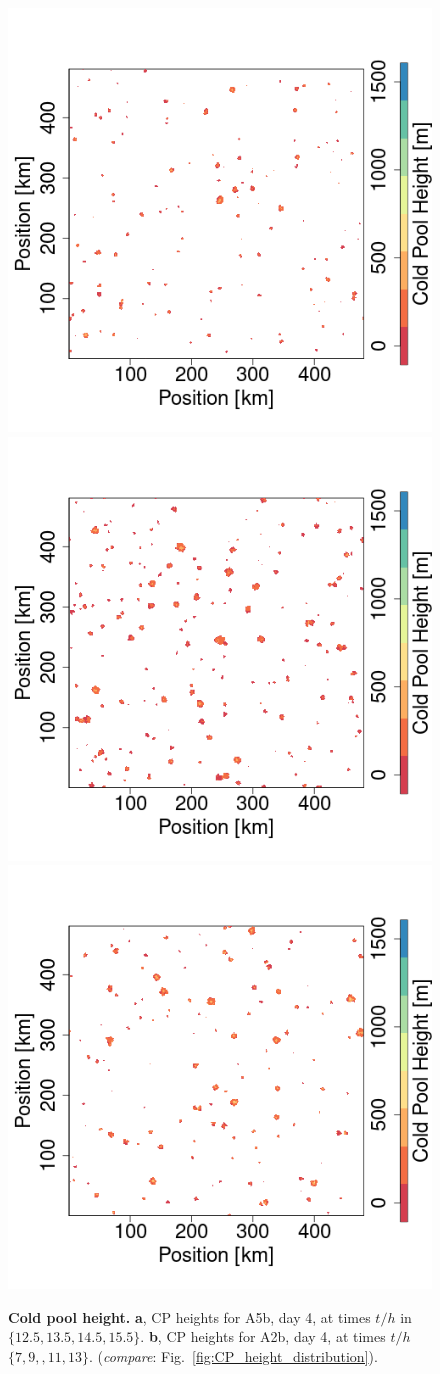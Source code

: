 \documentclass{article}
\begin{document}
\begin{figure}[ht]
\includegraphics[trim={2.5cm 0 2.6cm 0},clip,height=.3\linewidth]{T0_300K_ampl_4_1km_865-1172sequence_CPheight_109.png}
\includegraphics[trim={2.5cm 0 2.6cm 0},clip,height=.3\linewidth]{T0_300K_ampl_4_1km_865-1172sequence_CPheight_133.png}
\includegraphics[trim={2.5cm 0 0 0},clip,height=.3\linewidth]{T0_300K_ampl_4_1km_865-1172sequence_CPheight_157.png}
\vspace{0cm}
\caption{{\bf Cold pool height.}
{\bf a}, CP heights for A5b, day 4, at times $t/h$ in $\{12.5, 13.5, 14.5, 15.5\}$. 
{\bf b}, CP heights for A2b, day 4, at times $t/h$ $\{7, 9,, 11, 13\}$. ({\it compare}: Fig.~\ref{fig:CP_height_distribution}).
}
\label{fig:CP_heights_space}
\end{figure}
\end{document}
